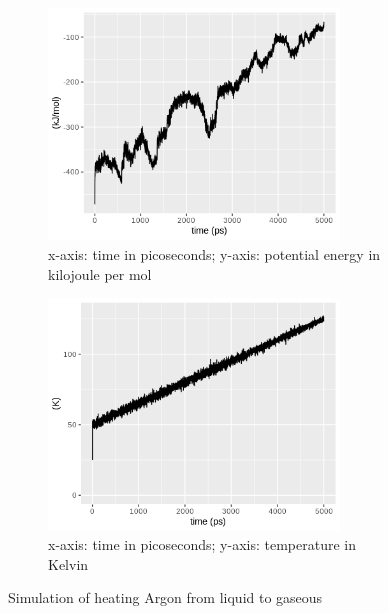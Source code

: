 \documentclass[10pt, a4paper, oneside, twocolumn]{report}
\begin{document}
\begin{figure}
	\begin{subfigure}[HB!]{0.5\textwidth}
		\includegraphics[width=0.85\textwidth]{plots/Heatup/pot_energy_heatup.png}
		\caption{x-axis: time in picoseconds; y-axis: potential energy in kilojoule per mol}
	\end{subfigure}
	\begin{subfigure}[HB!]{0.5\textwidth}
		\includegraphics[width=0.85\textwidth]{plots/Heatup/temp_heatup.png}
		\caption{x-axis: time in picoseconds; y-axis: temperature in Kelvin}
	\end{subfigure}
	\caption{Simulation of heating Argon from liquid to gaseous}
\end{figure}
\end{document}
